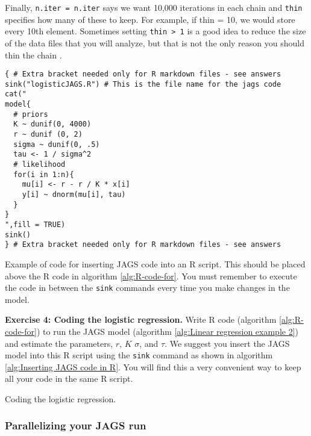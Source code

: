 \documentclass[12pt,english]{article}
\begin{document}
Finally, \texttt{n.iter = n.iter} says we want 10,000 iterations in each chain and \texttt{thin} specifies how many of these to keep. For example, if thin = 10, we would store every 10th element. Sometimes setting \texttt{thin > 1} is a good idea to reduce the size of the data files that you will analyze, but that is not the only reason you should thin the chain \citep{Link:2012ve}.

\begin{algorithm}
\begin{Verbatim}[frame=single]
{ # Extra bracket needed only for R markdown files - see answers
sink("logisticJAGS.R") # This is the file name for the jags code
cat("
model{
  # priors
  K ~ dunif(0, 4000)
  r ~ dunif (0, 2)
  sigma ~ dunif(0, .5) 
  tau <- 1 / sigma^2
  # likelihood
  for(i in 1:n){
    mu[i] <- r - r / K * x[i]
    y[i] ~ dnorm(mu[i], tau)
  }
}  
",fill = TRUE)
sink()
} # Extra bracket needed only for R markdown files - see answers
\end{Verbatim}
\caption[Example of code for inserting JAGS code within R script]{Example of code for inserting JAGS code into an R script. This should be placed above the R code in algorithm \ref{alg:R-code-for}. You must remember to execute the code in between the \texttt{sink} commands every time you make changes in the model.}
\label{alg:Inserting JAGS code in R}
\end{algorithm}

\belowcaptionskip=-40pt
\begin{exercise}
\begin{mdframed}
\doublespacing
\textbf{Exercise 4: Coding the logistic regression.} Write R code (algorithm \ref{alg:R-code-for}) to run the JAGS model (algorithm \ref{alg:Linear regression example 2}) and estimate the parameters, $r$, $K$ $\sigma$, and $\tau$. We suggest you insert the JAGS model into this R script using the \texttt{sink} command as shown in algorithm \ref{alg:Inserting JAGS code in R}. You will find this a very convenient way to keep all your code in the same R script. 
\end{mdframed}
\captionsetup{textformat=empty, labelformat=empty}
\caption[Coding the logistic regression]{Coding the logistic regression.}
\label{ex:logistic regression sequential}
\end{exercise}
\belowcaptionskip=0pt

\subsubsection{Parallelizing your JAGS run}
\end{document}
